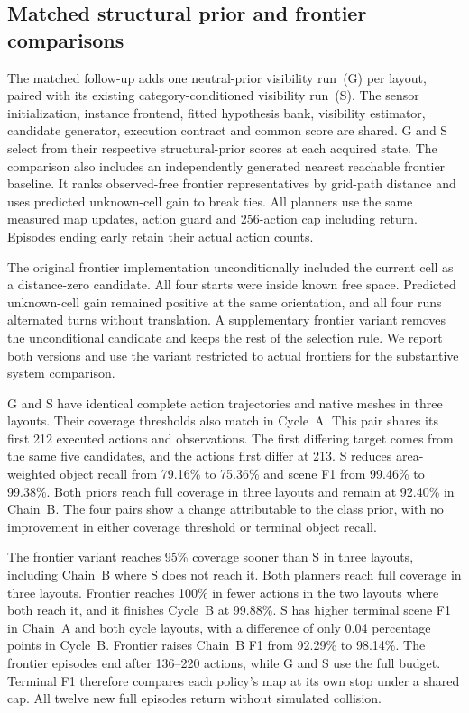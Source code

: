 \subsection{Matched structural prior and frontier comparisons}
The matched follow-up adds one neutral-prior visibility run~(G) per layout, paired with its existing category-conditioned visibility run~(S). The sensor initialization, instance frontend, fitted hypothesis bank, visibility estimator, candidate generator, execution contract and common score are shared. G and S select from their respective structural-prior scores at each acquired state. The comparison also includes an independently generated nearest reachable frontier baseline. It ranks observed-free frontier representatives by grid-path distance and uses predicted unknown-cell gain to break ties. All planners use the same measured map updates, action guard and 256-action cap including return. Episodes ending early retain their actual action counts.

The original frontier implementation unconditionally included the current cell as a distance-zero candidate. All four starts were inside known free space. Predicted unknown-cell gain remained positive at the same orientation, and all four runs alternated turns without translation. A supplementary frontier variant removes the unconditional candidate and keeps the rest of the selection rule. We report both versions and use the variant restricted to actual frontiers for the substantive system comparison.



G and S have identical complete action trajectories and native meshes in three layouts. Their coverage thresholds also match in Cycle~A. This pair shares its first 212 executed actions and observations. The first differing target comes from the same five candidates, and the actions first differ at 213. S reduces area-weighted object recall from 79.16\% to 75.36\% and scene F1 from 99.46\% to 99.38\%. Both priors reach full coverage in three layouts and remain at 92.40\% in Chain~B. The four pairs show a change attributable to the class prior, with no improvement in either coverage threshold or terminal object recall.

The frontier variant reaches 95\% coverage sooner than S in three layouts, including Chain~B where S does not reach it. Both planners reach full coverage in three layouts. Frontier reaches 100\% in fewer actions in the two layouts where both reach it, and it finishes Cycle~B at 99.88\%. S has higher terminal scene F1 in Chain~A and both cycle layouts, with a difference of only 0.04 percentage points in Cycle~B. Frontier raises Chain~B F1 from 92.29\% to 98.14\%. The frontier episodes end after 136--220 actions, while G and S use the full budget. Terminal F1 therefore compares each policy's map at its own stop under a shared cap. All twelve new full episodes return without simulated collision.
